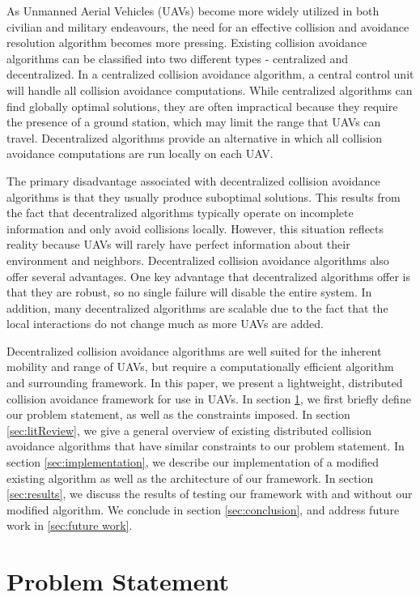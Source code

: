 \documentclass[conference]{IEEEtran}
\begin{document}
As Unmanned Aerial Vehicles (UAVs) become more widely utilized in both civilian and military endeavours, the need for an effective collision and avoidance resolution algorithm becomes more pressing. 
Existing collision avoidance algorithms can be classified into two different types - centralized and decentralized.  
In a centralized collision avoidance algorithm, a central control unit will handle all collision avoidance computations. 
While centralized algorithms can find globally optimal solutions, they are often impractical because they require the presence of a ground station, which may limit the range that UAVs can travel. Decentralized algorithms provide an alternative in which all collision avoidance computations are run locally on each UAV.

The primary disadvantage associated with decentralized collision avoidance algorithms is that they usually produce suboptimal solutions.  This results from the fact that decentralized algorithms typically operate on incomplete information and only avoid collisions locally. However, this situation reflects reality because UAVs will rarely have perfect information about their environment and neighbors. Decentralized collision avoidance algorithms also offer several advantages. One key advantage that decentralized algorithms offer is that they are robust, so no single failure will disable the entire system. In addition, many decentralized algorithms are scalable due to the fact that the local interactions do not change much as more UAVs are added.

Decentralized collision avoidance algorithms are well suited for the inherent mobility and range of UAVs, but require a computationally efficient algorithm and surrounding framework. In this paper, we present a lightweight, distributed collision avoidance framework for use in UAVs. In section \ref{sec:problem}, we first briefly define our problem statement, as well as the constraints imposed. In section \ref{sec:litReview}, we give a general overview of existing distributed collision avoidance algorithms that have similar constraints to our problem statement. In section \ref{sec:implementation}, we describe our implementation of a modified existing algorithm as well as the architecture of our framework. In section \ref{sec:results}, we discuss the results of testing our framework with and without our modified algorithm. We conclude in section 
\ref{sec:conclusion}, and address future work in \ref{sec:future work}. 

\section{Problem Statement}
\label{sec:problem}
\end{document}
